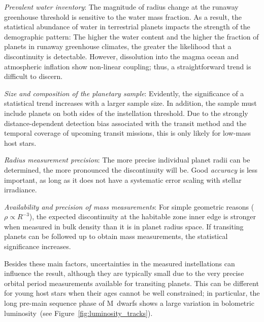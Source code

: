 \documentclass[twocolumn,twocolappendix]{aastex631}
\begin{document}
\textit{Prevalent water inventory}: The magnitude of radius change at the runaway greenhouse threshold is sensitive to the water mass fraction.
As a result, the statistical abundance of water in terrestrial planets impacts the strength of the demographic pattern:
The higher the water content and the higher the fraction of planets in runaway greenhouse climates, the greater the likelihood that a discontinuity is detectable.
However, dissolution into the magma ocean and atmospheric inflation show non-linear coupling; thus, a straightforward trend is difficult to discern.

\textit{Size and composition of the planetary sample}: Evidently, the significance of a statistical trend increases with a larger sample size.
In addition, the sample must include planets on both sides of the instellation threshold.
Due to the strongly distance-dependent detection bias associated with the transit method and the temporal coverage of upcoming transit missions, this is only likely for low-mass host stars.

\textit{Radius measurement precision}: The more precise individual planet radii can be determined, the more pronounced the discontinuity will be.
Good \textit{accuracy} is less important, as long as it does not have a systematic error scaling with stellar irradiance.

\textit{Availability and precision of mass measurements}: For simple geometric reasons ($\rho \propto R^{-3}$), the expected discontinuity at the habitable zone inner edge is stronger when measured in bulk density than it is in planet radius space.
If transiting planets can be followed up to obtain mass measurements, the statistical significance increases.

Besides these main factors, uncertainties in the measured instellations can influence the result, although they are typically small due to the very precise orbital period measurements available for transiting planets.
This can be different for young host stars when their ages cannot be well constrained; in particular, the long pre-main sequence phase of M~dwarfs shows a large variation in bolometric luminosity~(see Figure~\ref{fig:luminosity_tracks}).
\end{document}
